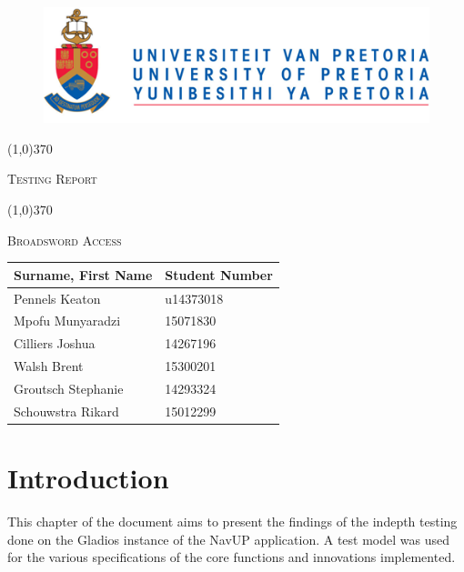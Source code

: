 \documentclass[english]{article}
\begin{document}
	
	\begin{figure}
		\includegraphics[width=\linewidth]{up_logo.png}
	\end{figure}
	
	\begin{center}
	 \line(1,0){370}
	\\[0.2cm]
    {\scshape\Large Testing Report  \par}
	\vspace{0.1cm}
	\line(1,0){370}
	\\[0.8cm]
	
	 {\scshape\Large Broadsword Access \par}
	\vspace{0.9cm}
	
	\begin{tabu} to \textwidth { X[l] X[l]}
		\hline
		\textbf{Surname, First Name  }	& \textbf{Student Number}	\\ \hline \hline
		Pennels 	Keaton   & u14373018	\\ \hline
		Mpofu	Munyaradzi   &15071830		\\ \hline
		Cilliers	Joshua   &14267196		\\ \hline
		Walsh     Brent    &15300201		\\ \hline
		Groutsch	Stephanie    &14293324		\\ \hline
		Schouwstra	Rikard    &15012299		\\ \hline
		\hline
	\end{tabu}
	
	\end{center}
	
	
	\newpage
	\tableofcontents

	\newpage
	
	\section{Introduction}

				This chapter of the document aims to present the findings of the indepth testing done on the Gladios instance of the NavUP application. A test model was used for the various specifications of the core functions and innovations implemented.
\end{document}

